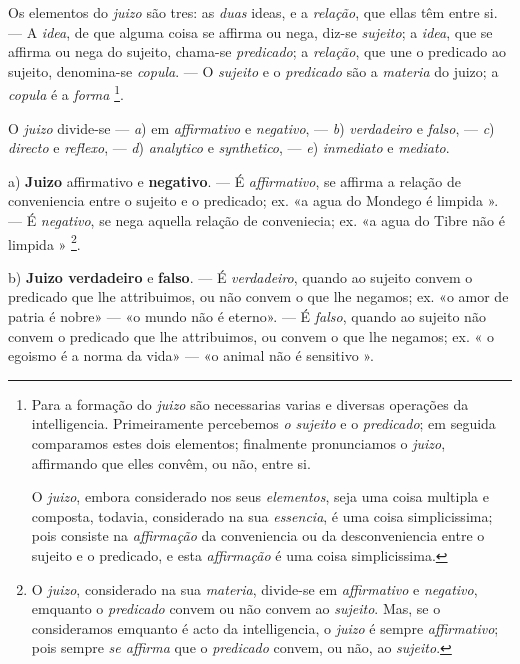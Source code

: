 
Os elementos do \emph{juizo} são tres: as \emph{duas} ideas, e a \emph{relação}, que ellas têm entre si. --- A \emph{idea}, de que alguma coisa se affirma ou nega, diz-se \emph{sujeito}; a \emph{idea}, que se affirma ou nega do sujeito, chama-se \emph{predicado}; a \emph{relação}, que une o predicado ao sujeito, denomina-se \emph{copula}. --- O \emph{sujeito} e o \emph{predicado} são a \emph{materia} do juizo; a \emph{copula} é a \emph{forma} \footnote{Para a formação do \emph{juizo} são necessarias varias e diversas operações da intelligencia. Primeiramente percebemos \emph{o sujeito} e o \emph{predicado}; em seguida comparamos estes dois elementos; finalmente pronunciamos o \emph{juizo}, affirmando que elles convêm, ou não, entre si.\par O \emph{juizo}, embora considerado nos seus \emph{elementos}, seja uma coisa multipla e composta, todavia, considerado na sua \emph{essencia}, é uma coisa simplicissima; pois consiste na \emph{affirmação} da conveniencia ou da desconveniencia entre o sujeito e o predicado, e esta \emph{affirmação} é uma coisa simplicissima.}.


 
O \emph{juizo} divide-se --- \emph{a}) em \emph{affirmativo} e \emph{negativo}, --- \emph{b}) \emph{verdadeiro} e \emph{falso}, --- \emph{c}) \emph{directo} e \emph{reflexo}, --- \emph{d}) \emph{analytico} e \emph{synthetico}, --- \emph{e}) \emph{inmediato} e \emph{mediato}.

a) \textbf{Juizo} affirmativo e \textbf{negativo}. --- É \emph{affirmativo}, se affirma a relação de conveniencia entre o sujeito e o predicado; ex. «a agua do Mondego é limpida ». --- É \emph{negativo}, se nega aquella relação de conveniecia; ex. «a agua do Tibre não é limpida » \footnote{O \emph{juizo}, considerado na sua \emph{materia}, divide-se em \emph{affirmativo} e \emph{negativo}, emquanto o \emph{predicado} convem ou não convem ao \emph{sujeito}. Mas, se o consideramos emquanto é acto da intelligencia, o \emph{juizo} é sempre \emph{affirmativo}; pois sempre \emph{se affirma} que o \emph{predicado} convem, ou não, ao \emph{sujeito}.}.

b) \textbf{Juizo verdadeiro} e \textbf{falso}. --- É \emph{verdadeiro}, quando ao sujeito convem o predicado que lhe attribuimos, ou não convem o que lhe negamos; ex. «o amor de patria é nobre» --- «o mundo não é eterno». --- É \emph{falso}, quando ao sujeito não convem o predicado que lhe attribuimos, ou convem o que lhe negamos; ex. « o egoismo é a norma da vida» --- «o animal não é sensitivo ».

